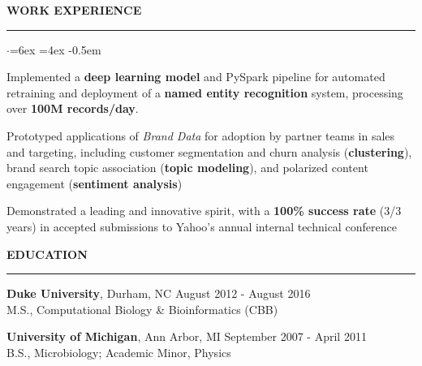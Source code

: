 \documentclass[11pt]{article}
\newenvironment{rSection}[1]{ %
  \sectionskip
  \MakeUppercase{\textbf{#1}} %
  \sectionlineskip
  \hrule %
  \begin{list}{}{ %
    \setlength{\leftmargin}{1.5em} %
  }
  \item[]
}{
  \end{list}
}
\def\sectionlineskip{\smallskip} %
\def\sectionskip{\smallskip} %
\begin{document}
\begin{rSection}{Work Experience}
\begin{list}{$\cdot$}{\leftmargin=6ex \rightmargin=4ex} %
   \itemsep -0.5em \vspace{-0.5em} %
   \item Implemented a \textbf{deep learning model} and PySpark pipeline for automated retraining and deployment of a \textbf{named entity recognition} system, processing over \textbf{100M records/day}.
   \item Prototyped applications of \textit{Brand Data} for adoption by partner teams in sales and targeting, including customer segmentation and churn analysis (\textbf{clustering}), brand search topic association (\textbf{topic modeling}), and polarized content engagement (\textbf{sentiment analysis})
   \item Demonstrated a leading and innovative spirit, with a \textbf{100\% success rate} (3/3 years) in accepted submissions to Yahoo's annual internal technical conference
\end{list}

\end{rSection}


\begin{rSection}{Education}

{\bfseries Duke University}, Durham, NC \hfill August 2012 - August 2016 \\
\hspace*{2ex} M.S., Computational Biology \& Bioinformatics (CBB)

\vspace{-1ex}
{\bfseries University of Michigan}, Ann Arbor, MI \hfill September 2007 - April 2011 \\
\hspace*{2ex} B.S., Microbiology; Academic Minor, Physics

\end{rSection}
\end{document}
